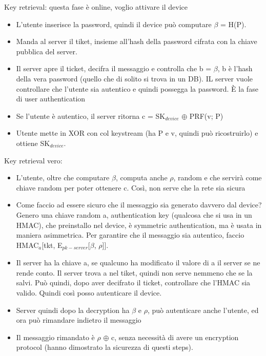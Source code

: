 \documentclass[16px]{article}
\begin{document}
Key retrieval: questa fase è online, voglio attivare il device
\begin{itemize}
\item L'utente inserisce la password, quindi il device può computare $\beta$ = H(P).
\item Manda al server il tiket, insieme all'hash della password cifrata con la chiave pubblica del server.
\item Il server apre il ticket, decifra il messaggio e controlla che b = $\beta$, b è l'hash della vera password (quello che di solito si trova in un DB). IL server vuole controllare che l'utente sia autentico e quindi possegga la password. È la fase di user authentication
\item Se l'utente è autentico, il server ritorna c = SK$_{device}$ $\oplus$ PRF(v; P)
\item Utente mette in XOR con col keystream (ha P e v, quindi può ricostruirlo) e ottiene SK$_{device}$.
\end{itemize}
Key retrieval vero:
\begin{itemize}
\item L'utente, oltre che computare $\beta$, computa anche $\rho$, random e che servirà come chiave random per poter ottenere c. Così, non serve che la rete sia sicura
\item Come faccio ad essere sicuro che il messaggio sia generato davvero dal device? Genero una chiave random a, authentication key (qualcosa che si usa in un HMAC), che preinstallo nel device, è symmetric authentication, ma è usata in maniera asimmetrica. Per garantire che il messaggio sia autentico, faccio HMAC$_a$[tkt, E$_{pk-server}$[$\beta$, $\rho$]].
\item Il server ha la chiave a, se qualcuno ha modificato il valore di a il server se ne rende conto. Il server trova a nel tiket, quindi non serve nemmeno che se la salvi. Può quindi, dopo aver decifrato il ticket, controllare che l'HMAC sia valido. Quindi così posso autenticare il device.
\item Server quindi dopo la decryption ha $\beta$ e $\rho$, può autenticare anche l'utente, ed ora può rimandare indietro il messaggio
\item Il messaggio rimandato è $\rho$ $\oplus$ c, senza necessità di avere un encryption protocol (hanno dimostrato la sicurezza di questi steps). 
\end{itemize}
\end{document}
